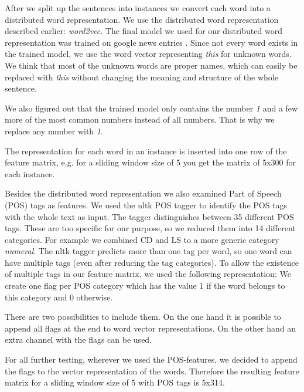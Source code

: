 After we split up the sentences into instances we convert each word into a distributed word representation.
We use the distributed word representation described earlier: \emph{word2vec}. 
The final model we used for our distributed word representation was trained on google news entries .
Since not every word exists in the trained model, we use the word vector representing \emph{this} for unknown words.
We think that most of the unknown words are proper names, which can easily be replaced with \emph{this} without changing the meaning and structure of the whole sentence.

We also figured out that the trained model only contains the number \emph{1} and a few more of the most common numbers instead of all numbers. 
That is why we replace any number with \emph{1}.

The representation for each word in an instance is inserted into one row of the feature matrix, e.g. for a sliding window size of 5 you get the matrix of 5x300 for each instance.

Besides the distributed word representation we also examined Part of Speech (POS) tags as features.
We used the nltk POS tagger to identify the POS tags with the whole text as input.
The tagger distinguishes between 35 different POS tags.
These are too specific for our purpose, so we reduced them into 14 different categories.
For example we combined CD and LS to a more generic category \emph{numeral}.
The nltk tagger predicts more than one tag per word, so one word can have multiple tags (even after reducing the tag categories).
To allow the existence of multiple tags in our feature matrix, we used the following representation:
We create one flag per POS category which has the value 1 if the word belongs to this category and 0 otherwise.

There are two possibilities to include them.
On the one hand it is possible to append all flags at the end to word vector representations.
On the other hand an extra channel with the flags can be used.

For all further testing, wherever we used the POS-features, we decided to append the flags to the vector representation of the words.
Therefore the resulting feature matrix for a sliding window size of 5 with POS tags is 5x314.


